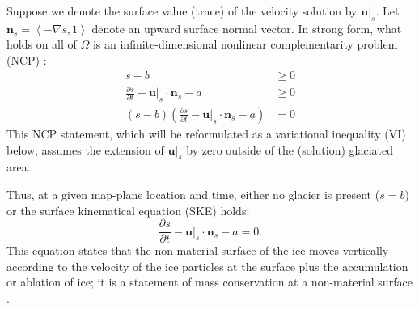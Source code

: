 \documentclass[hidelinks,onefignum,onetabnum,final]{siamart220329}  %
\newcommand{\grad}{\nabla}
\newcommand{\bn}{\mathbf{n}}
\newcommand{\bu}{\mathbf{u}}
\begin{document}
Suppose we denote the surface value (trace) of the velocity solution by $\bu|_s$.  Let $\bn_s = \left<-\grad s,1\right>$ denote an upward surface normal vector.  In strong form, what holds on all of $\Omega$ is an infinite-dimensional nonlinear complementarity problem (NCP) \cite{FacchineiPang2003}:
\begin{subequations}
\label{eq:ncp}
\begin{align}
s - b &\ge 0 \\
\frac{\partial s}{\partial t} - \bu|_s \cdot \bn_s - a &\ge 0 \\
(s - b) \left(\frac{\partial s}{\partial t} - \bu|_s \cdot \bn_s - a\right) &= 0
\end{align}
\end{subequations}
This NCP statement, which will be reformulated as a variational inequality (VI) \cite{KinderlehrerStampacchia1980} below, assumes the extension of $\bu|_s$ by zero outside of the (solution) glaciated area.

Thus, at a given map-plane location and time, either no glacier is present ($s=b$) or the surface kinematical equation (SKE) holds:
\begin{equation}
\frac{\partial s}{\partial t} - \bu|_s \cdot \bn_s - a = 0.  \label{eq:ske}
\end{equation}
This equation states that the non-material surface of the ice moves vertically according to the velocity of the ice particles at the surface plus the accumulation or ablation of ice; it is a statement of mass conservation at a non-material surface \cite{Aschwandenetal2012}.
\end{document}
